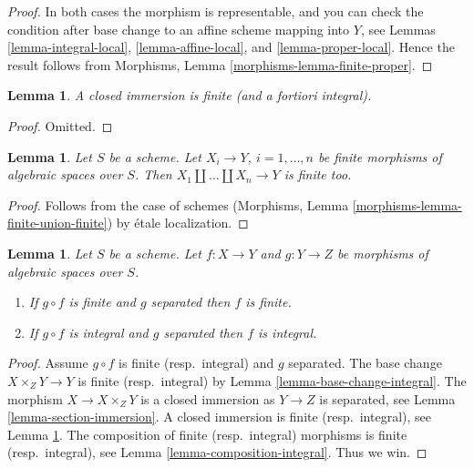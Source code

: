 \documentclass{stacks-project}
\theoremstyle{plain}
\newtheorem{lemma}[subsection]{Lemma}
\theoremstyle{definition}
\theoremstyle{remark}
\numberwithin{equation}{subsection}
\begin{document}
\begin{proof}
In both cases the morphism is representable, and you can check the condition
after base change to an affine scheme mapping into $Y$, see
Lemmas \ref{lemma-integral-local}, \ref{lemma-affine-local}, and
\ref{lemma-proper-local}. Hence the result follows from
Morphisms, Lemma \ref{morphisms-lemma-finite-proper}.
\end{proof}

\begin{lemma}
\label{lemma-closed-immersion-finite}
A closed immersion is finite (and a fortiori integral).
\end{lemma}

\begin{proof}
Omitted.
\end{proof}

\begin{lemma}
\label{lemma-finite-union-finite}
Let $S$ be a scheme.
Let $X_i \to Y$, $i = 1, \ldots, n$ be finite morphisms of
algebraic spaces over $S$.
Then $X_1 \amalg \ldots \amalg X_n \to Y$ is finite too.
\end{lemma}

\begin{proof}
Follows from the case of schemes
(Morphisms, Lemma \ref{morphisms-lemma-finite-union-finite})
by \'etale localization.
\end{proof}

\begin{lemma}
\label{lemma-finite-permanence}
Let $S$ be a scheme.
Let $f : X \to Y$ and $g : Y \to Z$ be morphisms of algebraic spaces over $S$.
\begin{enumerate}
\item If $g \circ f$ is finite and $g$ separated then $f$ is finite.
\item If $g \circ f$ is integral and $g$ separated then $f$ is integral.
\end{enumerate}
\end{lemma}

\begin{proof}
Assume $g \circ f$ is finite (resp.\ integral) and $g$ separated.
The base change $X \times_Z Y \to Y$ is finite (resp.\ integral) by
Lemma \ref{lemma-base-change-integral}.
The morphism $X \to X \times_Z Y$ is
a closed immersion as $Y \to Z$ is separated, see
Lemma \ref{lemma-section-immersion}.
A closed immersion is finite (resp.\ integral),
see Lemma \ref{lemma-closed-immersion-finite}.
The composition of finite (resp.\ integral) morphisms is finite
(resp.\ integral),
see Lemma \ref{lemma-composition-integral}. Thus we win.
\end{proof}
\end{document}
